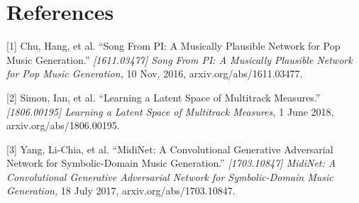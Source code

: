 \documentclass{article}
\begin{document}
\section*{References}

\small

[1] Chu, Hang, et al. ``Song From PI: A Musically Plausible Network for Pop Music Generation.'' {\it [1611.03477] Song From PI: A Musically Plausible Network for Pop Music Generation,} 10 Nov. 2016, arxiv.org/abs/1611.03477.

[2] Simon, Ian, et al. ``Learning a Latent Space of Multitrack Measures.'' {\it[1806.00195] Learning a Latent Space of Multitrack Measures,} 1 June 2018, arxiv.org/abs/1806.00195.

[3] Yang, Li-Chia, et al. ``MidiNet: A Convolutional Generative Adversarial Network for Symbolic-Domain Music Generation.'' {\it[1703.10847] MidiNet: A Convolutional Generative Adversarial Network for Symbolic-Domain Music Generation,} 18 July 2017, arxiv.org/abs/1703.10847.
\end{document}
